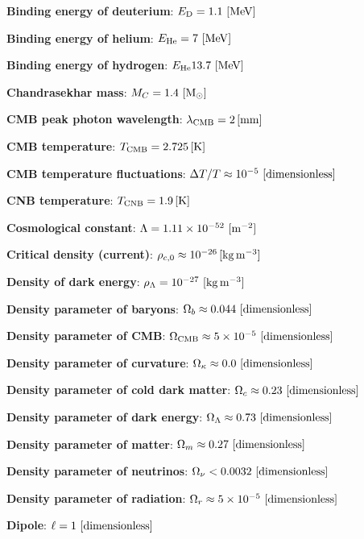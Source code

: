 \documentclass[a4paper,11pt]{article}
\begin{document}
{\noindent}\textbf{Binding energy of deuterium}: $E_\mathrm{D} = 1.1 ~ [{\rm MeV}]$

{\noindent}\textbf{Binding energy of helium}: $E_\mathrm{He} = 7 ~ [{\rm MeV}]$

{\noindent}\textbf{Binding energy of hydrogen}: $E_\mathrm{He} 13.7 ~ [{\rm MeV}]$

{\noindent}\textbf{Chandrasekhar mass}: $M_C = 1.4 ~ [{\rm M_\odot}]$

{\noindent}\textbf{CMB peak photon wavelength}: $\lambda_\mathrm{CMB} = 2\,[{\rm mm}]$

{\noindent}\textbf{CMB temperature}: $T_\mathrm{CMB} = 2.725\,[{\rm K}]$

{\noindent}\textbf{CMB temperature fluctuations}: $\Delta T/T\approx10^{-5} ~ [{\rm dimensionless}]$

{\noindent}\textbf{CNB temperature}: $T_\mathrm{CNB} = 1.9\,[{\rm K}]$

{\noindent}\textbf{Cosmological constant}: $\Lambda=1.11\times10^{-52} ~ [{\rm m^{-2}}]$

{\noindent}\textbf{Critical density (current)}: $\rho_{c,0}\approx10^{-26}\,[{\rm kg\,m^{-3}}]$

{\noindent}\textbf{Density of dark energy}: $\rho_\Lambda = 10^{-27} ~ [{\rm kg\,m^{-3}}]$

{\noindent}\textbf{Density parameter of baryons}: $\Omega_b \approx 0.044 ~ [{\rm dimensionless}]$

{\noindent}\textbf{Density parameter of CMB}: $\Omega_\mathrm{CMB} \approx 5\times10^{-5} ~ [{\rm dimensionless}]$

{\noindent}\textbf{Density parameter of curvature}: $\Omega_\kappa \approx 0.0 ~ [{\rm dimensionless}]$

{\noindent}\textbf{Density parameter of cold dark matter}: $\Omega_c \approx 0.23 ~ [{\rm dimensionless}]$

{\noindent}\textbf{Density parameter of dark energy}: $\Omega_\Lambda \approx 0.73 ~ [{\rm dimensionless}]$

{\noindent}\textbf{Density parameter of matter}: $\Omega_m \approx 0.27 ~ [{\rm dimensionless}]$

{\noindent}\textbf{Density parameter of neutrinos}: $\Omega_\nu < 0.0032 ~ [{\rm dimensionless}]$

{\noindent}\textbf{Density parameter of radiation}: $\Omega_r \approx 5\times10^{-5} ~ [{\rm dimensionless}]$

{\noindent}\textbf{Dipole}: $\ell=1 ~ [{\rm dimensionless}]$
\end{document}
